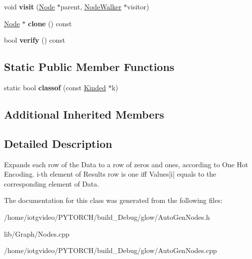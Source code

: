 \begin{DoxyCompactItemize}
\mbox{\label{classglow_1_1_batch_one_hot_node_a194c8bf4b2adfc1ba7af64ba5502c060}} 
void {\bfseries visit} (\hyperlink{classglow_1_1_node}{Node} $\ast$parent, \hyperlink{classglow_1_1_node_walker}{Node\+Walker} $\ast$visitor)
\item 
\mbox{\label{classglow_1_1_batch_one_hot_node_a54b784ea0e92550ff9f786eae7e3532c}} 
\hyperlink{classglow_1_1_node}{Node} $\ast$ {\bfseries clone} () const
\item 
\mbox{\label{classglow_1_1_batch_one_hot_node_a235a640de134b2bb1478fa3c2c7c8b17}} 
bool {\bfseries verify} () const
\end{DoxyCompactItemize}
\subsection*{Static Public Member Functions}
\begin{DoxyCompactItemize}
\item 
\mbox{\label{classglow_1_1_batch_one_hot_node_a91dbbb1799fa98ebb1647fb6691158a0}} 
static bool {\bfseries classof} (const \hyperlink{classglow_1_1_kinded}{Kinded} $\ast$k)
\end{DoxyCompactItemize}
\subsection*{Additional Inherited Members}


\subsection{Detailed Description}
Expands each row of the Data to a row of zeros and ones, according to One Hot Encoding. i-\/th element of Result\textquotesingle{}s row is one iff Values\mbox{[}i\mbox{]} equals to the corresponding element of Data. 

The documentation for this class was generated from the following files\+:\begin{DoxyCompactItemize}
\item 
/home/iotgvideo/\+P\+Y\+T\+O\+R\+C\+H/build\+\_\+\+Debug/glow/Auto\+Gen\+Nodes.\+h\item 
lib/\+Graph/Nodes.\+cpp\item 
/home/iotgvideo/\+P\+Y\+T\+O\+R\+C\+H/build\+\_\+\+Debug/glow/Auto\+Gen\+Nodes.\+cpp\end{DoxyCompactItemize}
